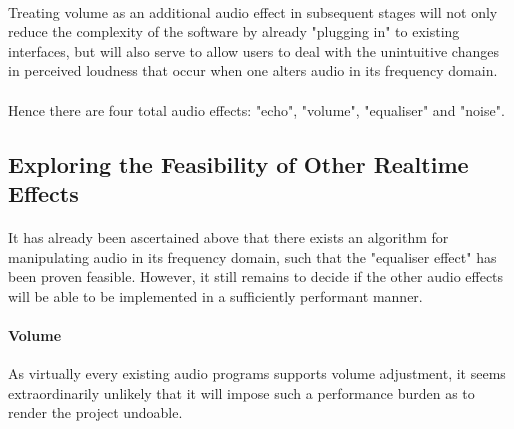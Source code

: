 \paragraph{}
Treating volume as an additional audio effect in subsequent stages will not only reduce the complexity of the software by already "plugging in" to existing interfaces, but will also serve to allow users to deal with the unintuitive changes in perceived loudness that occur when one alters audio in its frequency domain.

\paragraph{}
Hence there are four total audio effects: "echo", "volume", "equaliser" and "noise".

\pagebreak
\subsection{Exploring the Feasibility of Other Realtime Effects}
\paragraph{}
It has already been ascertained above that there exists an algorithm for manipulating audio in its frequency domain, such that the "equaliser effect" has been proven feasible. However, it still remains to decide if the other audio effects will be able to be implemented in a sufficiently performant manner. 

\paragraph{Volume} As virtually every existing audio programs supports volume adjustment, it seems extraordinarily unlikely that it will impose such a performance burden as to render the project undoable.

